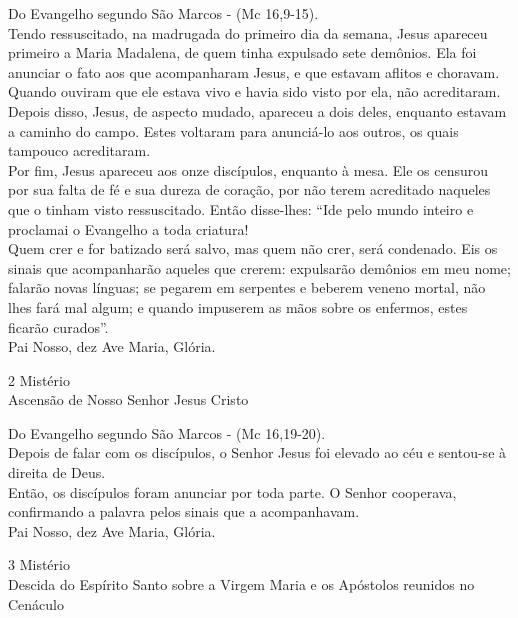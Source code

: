\begin{flushleft}
    Do Evangelho segundo São Marcos - (\textcolor{VioletRed2}{Mc 16,9-15}). \\
    \hfill{} \break{}
    Tendo ressuscitado, na madrugada do primeiro dia da semana, Jesus apareceu primeiro a Maria Madalena, de quem tinha expulsado sete demônios. Ela foi anunciar o fato aos que acompanharam Jesus, e que estavam aflitos e choravam. Quando ouviram que ele estava vivo e havia sido visto por ela, não acreditaram. Depois disso, Jesus, de aspecto mudado, apareceu a dois deles, enquanto estavam a caminho do campo. Estes voltaram para anunciá-lo aos outros, os quais tampouco acreditaram.
    \vspace{.2cm} \\
    Por fim, Jesus apareceu aos onze discípulos, enquanto à mesa. Ele os censurou por sua falta de fé e sua dureza de coração, por não terem acreditado naqueles que o tinham visto ressuscitado. Então disse-lhes: ``Ide pelo mundo inteiro e proclamai o Evangelho a toda criatura!
    \vspace{.2cm} \\
    Quem crer e for batizado será salvo, mas quem não crer, será condenado. Eis os sinais que acompanharão aqueles que crerem: expulsarão demônios em meu nome; falarão novas línguas; se pegarem em serpentes e beberem veneno mortal, não lhes fará mal algum; e quando impuserem as mãos sobre os enfermos, estes ficarão curados''. \\
    \hfill{} \break{}
    Pai Nosso, dez Ave Maria, Glória.
\end{flushleft}
\begin{center}
    2\textordmasculine{} Mistério \\ Ascensão de Nosso Senhor Jesus Cristo
\end{center}
\begin{flushleft}
    Do Evangelho segundo São Marcos - (\textcolor{VioletRed2}{Mc 16,19-20}). \\
    \hfill{} \break{}
    Depois de falar com os discípulos, o Senhor Jesus foi elevado ao céu e sentou-se à direita de Deus.
    \vspace{.2cm} \\
    Então, os discípulos foram anunciar por toda parte. O Senhor cooperava, confirmando a palavra pelos sinais que a acompanhavam. \\
    \hfill{} \break{}
    Pai Nosso, dez Ave Maria, Glória.
\end{flushleft}
\newpage
\begin{center}
    3\textordmasculine{} Mistério \\ Descida do Espírito Santo sobre a Virgem Maria e os Apóstolos reunidos no Cenáculo
\end{center}
